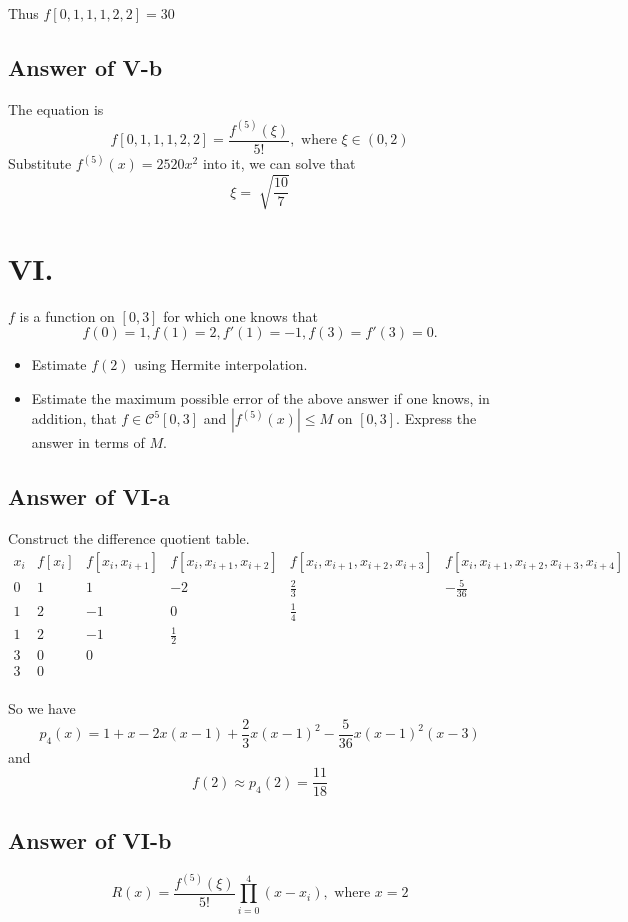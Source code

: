 \documentclass[a4paper]{article}
\begin{document}
Thus $f[0,1,1,1,2,2]=30$

\subsection*{Answer of V-b}
The equation is $$f[0,1,1,1,2,2]=\frac{f^{(5)}(\xi)}{5!}, \text{ where } \xi \in (0,2)$$
Substitute $f^{(5)}(x)=2520x^2$ into it, we can solve that
$$\xi=\sqrt[]{\frac{10}{7}}$$

\section*{VI.}
$f$ is a function on $[0,3]$ for which one knows that
$$f(0) = 1,f(1) = 2,f'(1) = -1,f(3) = f'(3) = 0.$$
\begin{itemize}
  \item Estimate $f(2)$ using Hermite interpolation.
  \item Estimate the maximum possible error of the above
  answer if one knows, in addition, that $f \in \mathcal{C}^5[0,3]$
  and $|f^{(5)}(x)| \leq M$ on $[0,3]$. Express the answer
  in terms of $M$.
\end{itemize}

\subsection*{Answer of VI-a}
Construct the difference quotient table.
$$
\begin{array}{c|ccccc}
x_i & f[x_i] & f[x_i, x_{i+1}] & f[x_i, x_{i+1},x_{i+2}] & f[x_i, x_{i+1},x_{i+2},x_{i+3}] & f[x_i, x_{i+1},x_{i+2},x_{i+3},x_{i+4}] \\
\hline
0 & 1 & 1 & -2 & \frac{2}{3} & -\frac{5}{36} \\
1 & 2 & -1 & 0 & \frac{1}{4} \\
1 & 2 & -1 & \frac{1}{2} \\
3 & 0 & 0 \\
3 & 0 \\
\end{array}
$$

So we have $$p_4(x)=1+x-2x(x-1)+\frac{2}{3}x(x-1)^{2}-\frac{5}{36}x(x-1)^{2}(x-3)$$ 
and $$f(2)\approx p_4(2)=\frac{11}{18}$$

\subsection*{Answer of VI-b}
$$R(x)=\frac{f^{(5)}(\xi)}{5!}\prod_{i=0}^{4}(x-x_i), \text{ where } x=2$$
\end{document}

